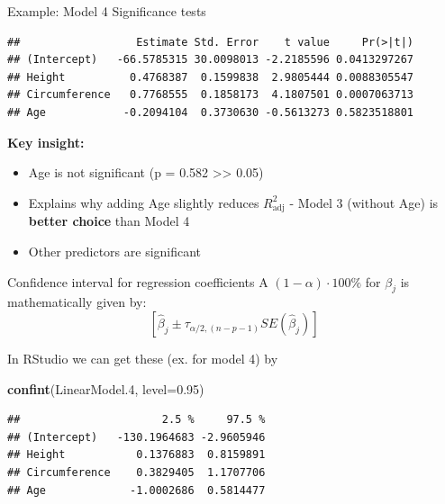 \documentclass[
  ignorenonframetext,
]{beamer}
\newenvironment{Shaded}{\begin{snugshade}}{\end{snugshade}}
\newcommand{\AttributeTok}[1]{\textcolor[rgb]{0.13,0.29,0.53}{#1}}
\newcommand{\FloatTok}[1]{\textcolor[rgb]{0.00,0.00,0.81}{#1}}
\newcommand{\FunctionTok}[1]{\textcolor[rgb]{0.13,0.29,0.53}{\textbf{#1}}}
\newcommand{\NormalTok}[1]{#1}
\begin{document}
\begin{frame}[fragile]{Example: Model 4 Significance tests}
\label{example-model-4-significance-tests}
\begin{verbatim}
##                  Estimate Std. Error    t value     Pr(>|t|)
## (Intercept)   -66.5785315 30.0098013 -2.2185596 0.0413297267
## Height          0.4768387  0.1599838  2.9805444 0.0088305547
## Circumference   0.7768555  0.1858173  4.1807501 0.0007063713
## Age            -0.2094104  0.3730630 -0.5613273 0.5823518801
\end{verbatim}

\textbf{Key insight:}

\begin{itemize}
\item
  Age is not significant (p = 0.582 \textgreater\textgreater{} 0.05)
\item
  Explains why adding Age slightly reduces \(R^2_{\text{adj}}\) - Model
  3 (without Age) is \textbf{better choice} than Model 4
\item
  Other predictors are significant
\end{itemize}
\end{frame}

\begin{frame}[fragile]{Confidence interval for regression coefficients}
\label{confidence-interval-for-regression-coefficients}
A \((1-\alpha)\cdot 100 \%\) for \(\beta_j\) is mathematically given by:
\[ \left[ \widehat{\beta}_j\pm \tau_{\alpha/2, (n-p-1)} SE(\widehat{\beta}_j) \right]\]

In RStudio we can get these (ex. for model 4) by

\begin{Shaded}
\begin{Highlighting}[]
\FunctionTok{confint}\NormalTok{(LinearModel}\FloatTok{.4}\NormalTok{, }\AttributeTok{level=}\FloatTok{0.95}\NormalTok{)}
\end{Highlighting}
\end{Shaded}

\begin{verbatim}
##                      2.5 %     97.5 %
## (Intercept)   -130.1964683 -2.9605946
## Height           0.1376883  0.8159891
## Circumference    0.3829405  1.1707706
## Age             -1.0002686  0.5814477
\end{verbatim}
\end{frame}
\end{document}
